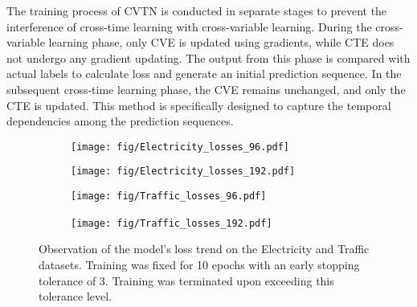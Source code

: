 The training process of CVTN is conducted in separate stages to prevent the interference of cross-time learning with cross-variable learning. During the cross-variable learning phase, only CVE is updated using gradients, while CTE does not undergo any gradient updating. The output from this phase is compared with actual labels to calculate loss and generate an initial prediction sequence. In the subsequent cross-time learning phase, the CVE remains unchanged, and only the CTE is updated. This method is specifically designed to capture the temporal dependencies among the prediction sequences.





\begin{figure}[!htbp]
  \centering
  \begin{subfigure}{.5\textwidth}
      \centering
      \texttt{[image: fig/Electricity\_losses\_96.pdf]}
      
  \end{subfigure}  \begin{subfigure}{.5\textwidth}
      \centering
      \texttt{[image: fig/Electricity\_losses\_192.pdf]}
  \end{subfigure}
  \begin{subfigure}{.5\textwidth}
    \centering
    \texttt{[image: fig/Traffic\_losses\_96.pdf]}
  \end{subfigure}  \begin{subfigure}{.5\textwidth}
      \centering
      \texttt{[image: fig/Traffic\_losses\_192.pdf]}\
  \end{subfigure}
  
  \caption{Observation of the model's loss trend on the Electricity and Traffic datasets. Training was fixed for 10 epochs with an early stopping tolerance of 3. Training was terminated upon exceeding this tolerance level.}
  \label{fig:TSFT}
\end{figure}


